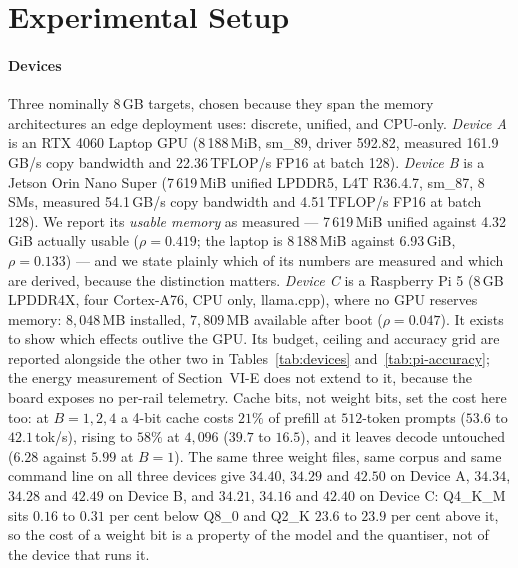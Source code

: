 \documentclass[10pt,journal]{IEEEtran}
\newcommand{\rhoSym}{\rho}
\begin{document}
\section{Experimental Setup}
\label{sec:setup}

\paragraph*{Devices}
Three nominally 8\,GB targets, chosen because they span the memory
architectures an edge deployment uses: discrete, unified, and CPU-only.
\emph{Device A} is an RTX 4060 Laptop GPU (8\,188\,MiB, sm\_89, driver 592.82,
measured 161.9\,GB/s copy bandwidth and 22.36\,TFLOP/s FP16 at batch 128).
\emph{Device B} is a Jetson Orin Nano Super (7\,619\,MiB unified LPDDR5,
L4T R36.4.7, sm\_87, 8 SMs, measured 54.1\,GB/s copy bandwidth and
4.51\,TFLOP/s FP16 at batch 128). We report its \emph{usable memory} as measured --- 7\,619\,MiB unified against
4.32\,GiB actually usable ($\rhoSym{=}0.419$; the laptop is 8\,188\,MiB against
6.93\,GiB, $\rhoSym{=}0.133$) --- and we state plainly which of its numbers are measured and
which are derived, because the distinction matters.
\emph{Device C} is a Raspberry Pi 5 (8\,GB LPDDR4X, four Cortex-A76, CPU only,
llama.cpp), where no GPU reserves memory: $8{,}048$\,MB installed, $7{,}809$\,MB
available after boot ($\rhoSym{=}0.047$). It exists to show which effects outlive the
GPU. Its budget, ceiling and accuracy grid are reported alongside the other two in
Tables~\ref{tab:devices} and~\ref{tab:pi-accuracy}; the energy measurement of
Section~VI-E does not extend to it, because the board exposes no per-rail
telemetry. Cache bits, not weight bits, set the cost here too: at $B{=}1,2,4$ a
4-bit cache costs $21\%$ of prefill at $512$-token prompts ($53.6$ to $42.1$\,tok/s),
rising to $58\%$ at $4{,}096$ ($39.7$ to $16.5$), and it leaves decode untouched
($6.28$ against $5.99$ at $B{=}1$). The same three weight files, same corpus and same command line on all three
devices give $34.40$, $34.29$ and $42.50$ on Device A, $34.34$, $34.28$ and
$42.49$ on Device B, and $34.21$, $34.16$ and $42.40$ on Device C: Q4\_K\_M
sits $0.16$ to $0.31$ per cent below Q8\_0 and Q2\_K $23.6$ to $23.9$ per cent
above it, so the cost of a weight bit is a property of the model and the
quantiser, not of the device that runs it.
\end{document}
